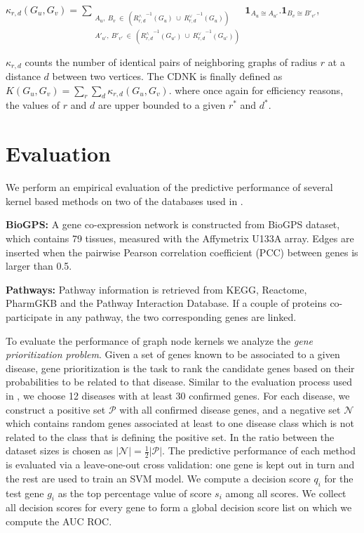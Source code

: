 \documentclass{esannV2}
\begin{document}
\begin{center}
 $\kappa_{r,d}(G_u,G_v) = \!\!\!\!\!\!\!\!\!\!\!\! \sum\limits_{\substack
 {A_u,\ {B}_{v} \ \in \ ({R_{r,d}^{\wedge}}^{ -1}(G_u)\ \cup\  {R_{r,d}^{\vee}}^{ -1}(G_u)) \\
  A'_{u'},\ {B'}_{v'} \ \in \ ({R_{r,d}^{\wedge}}^{ -1}(G_{u'})\ \cup\  {R_{r,d}^{\vee}}^{ -1}(G_{u'})) }} \!\!\!\!\!\!\!\!\!\!\!\!
  { \textbf{1}_{A_u \cong A_{u'}}.{ \textbf{1}_{B_{v} \cong B'_{v'}}}}$,
\end{center}
$\kappa_{r,d}$ counts the number of identical pairs of neighboring graphs of radius $r$ at a distance $d$ between two vertices. The CDNK is finally defined as 
$K(G_u,G_v) = \sum\limits_{r}{\sum\limits_{d}{\kappa_{r,d}(G_u,G_v)}}.$
where once again for efficiency reasons,
the values of $r$ and $d$ are upper bounded to a given $r^*$ and $d^*$.

\section{Evaluation}
\label{evaluation}
We perform an empirical evaluation of the predictive performance of several kernel based methods on two of the databases used in \cite{medk}.

\textbf{BioGPS:} A gene co-expression network is constructed from BioGPS dataset, which contains 79 tissues, measured with the Affymetrix U133A array. Edges are inserted when the pairwise Pearson correlation coefficient (PCC) between genes is larger than 0.5.

\textbf{Pathways:} Pathway information is retrieved from KEGG, Reactome, PharmGKB and the Pathway Interaction Database. If a couple of proteins co-participate in any pathway, the two corresponding genes are linked.  

To evaluate the performance of graph node kernels we analyze the {\em gene
prioritization problem}. Given a set of genes known to be associated to a
given disease, gene prioritization is the task to rank the candidate genes
based on their probabilities to be related to that disease. Similar to the
evaluation process used in \cite{medk}, we choose 12 diseases with at least 30
confirmed genes. For each disease, we construct a positive set $\mathcal{P}$
with all confirmed disease genes, and a negative set $\mathcal{N}$ which
contains random genes associated at least to one disease class which is not
related to the class that is defining the positive set. In \cite{medk} the
ratio between the dataset sizes is chosen as $\vert \mathcal{N} \vert =
\frac{1}{2} \vert \mathcal{P} \vert$. 
The predictive performance of each method is evaluated via a leave-one-out
cross validation: one gene is kept out in turn and the rest
are used to train an SVM model. 
We compute a decision score $q_i$ for the
test gene $g_i$ as the top percentage value of score $s_i$ among all scores.
We collect all decision scores for every gene to
form a global decision score list on which we compute the AUC ROC.
\end{document}
